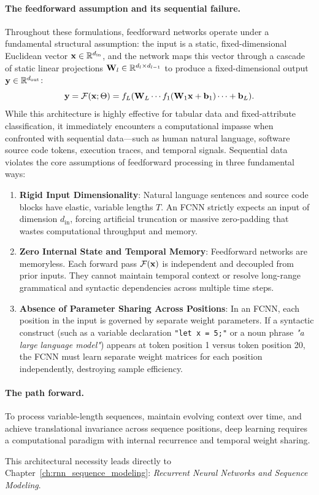 \documentclass[../../main.tex]{subfiles}
\begin{document}
\paragraph{The feedforward assumption and its sequential failure.}
Throughout these formulations, feedforward networks operate under a fundamental structural assumption: the input is a static, fixed-dimensional Euclidean vector $\mathbf{x} \in \mathbb{R}^{d_{\text{in}}}$, and the network maps this vector through a cascade of static linear projections $\mathbf{W}_l \in \mathbb{R}^{d_l \times d_{l-1}}$ to produce a fixed-dimensional output $\mathbf{y} \in \mathbb{R}^{d_{\text{out}}}$:
\begin{equation}
\label{eq:fcnn_static_cascade}
\mathbf{y} = \mathcal{F}(\mathbf{x}; \Theta) = f_L(\mathbf{W}_L \cdots f_1(\mathbf{W}_1 \mathbf{x} + \mathbf{b}_1) \cdots + \mathbf{b}_L).
\end{equation}
While this architecture is highly effective for tabular data and fixed-attribute classification, it immediately encounters a computational impasse when confronted with sequential data---such as human natural language, software source code tokens, execution traces, and temporal signals. Sequential data violates the core assumptions of feedforward processing in three fundamental ways:
\begin{enumerate}
    \item \textbf{Rigid Input Dimensionality}: Natural language sentences and source code blocks have elastic, variable lengths $T$. An FCNN strictly expects an input of dimension $d_{\text{in}}$, forcing artificial truncation or massive zero-padding that wastes computational throughput and memory.
    \item \textbf{Zero Internal State and Temporal Memory}: Feedforward networks are memoryless. Each forward pass $\mathcal{F}(\mathbf{x})$ is independent and decoupled from prior inputs. They cannot maintain temporal context or resolve long-range grammatical and syntactic dependencies across multiple time steps.
    \item \textbf{Absence of Parameter Sharing Across Positions}: In an FCNN, each position in the input is governed by separate weight parameters. If a syntactic construct (such as a variable declaration \texttt{"let x = 5;"} or a noun phrase \textit{"a large language model"}) appears at token position 1 versus token position 20, the FCNN must learn separate weight matrices for each position independently, destroying sample efficiency.
\end{enumerate}

\paragraph{The path forward.}
To process variable-length sequences, maintain evolving context over time, and achieve translational invariance across sequence positions, deep learning requires a computational paradigm with internal recurrence and temporal weight sharing.

This architectural necessity leads directly to Chapter~\ref{ch:rnn_sequence_modeling}: \emph{Recurrent Neural Networks and Sequence Modeling}.

\clearpage
\thispagestyle{empty}
\null
\clearpage
\end{document}
